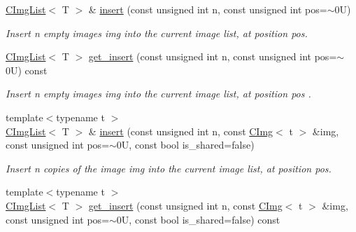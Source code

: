 \begin{Indent}
\begin{DoxyCompactItemize}
\hyperlink{structcimg__library__suffixed_1_1CImgList}{C\+Img\+List}$<$ T $>$ \& \hyperlink{structcimg__library__suffixed_1_1CImgList_a2e79008da95bb19c9f3541ce1ed592c8}{insert} (const unsigned int n, const unsigned int pos=$\sim$0\+U)
\begin{DoxyCompactList}\small\item\em Insert n empty images img into the current image list, at position {\ttfamily pos}. \end{DoxyCompactList}\item 
\mbox{\label{structcimg__library__suffixed_1_1CImgList_a847eb73d4dfcba9078b210cf80ce624b}} 
\hyperlink{structcimg__library__suffixed_1_1CImgList}{C\+Img\+List}$<$ T $>$ \hyperlink{structcimg__library__suffixed_1_1CImgList_a847eb73d4dfcba9078b210cf80ce624b}{get\+\_\+insert} (const unsigned int n, const unsigned int pos=$\sim$0\+U) const
\begin{DoxyCompactList}\small\item\em Insert n empty images img into the current image list, at position {\ttfamily pos} . \end{DoxyCompactList}\item 
{\footnotesize template$<$typename t $>$ }\\\hyperlink{structcimg__library__suffixed_1_1CImgList}{C\+Img\+List}$<$ T $>$ \& \hyperlink{structcimg__library__suffixed_1_1CImgList_a87ff890dcd5acf1eafb37fbf0c298b03}{insert} (const unsigned int n, const \hyperlink{structcimg__library__suffixed_1_1CImg}{C\+Img}$<$ t $>$ \&img, const unsigned int pos=$\sim$0\+U, const bool is\+\_\+shared=false)
\begin{DoxyCompactList}\small\item\em Insert {\ttfamily n} copies of the image {\ttfamily img} into the current image list, at position {\ttfamily pos}. \end{DoxyCompactList}\item 
\mbox{\label{structcimg__library__suffixed_1_1CImgList_a817d04c7b90f0cd39e33e740bf5f60f2}} 
{\footnotesize template$<$typename t $>$ }\\\hyperlink{structcimg__library__suffixed_1_1CImgList}{C\+Img\+List}$<$ T $>$ \hyperlink{structcimg__library__suffixed_1_1CImgList_a817d04c7b90f0cd39e33e740bf5f60f2}{get\+\_\+insert} (const unsigned int n, const \hyperlink{structcimg__library__suffixed_1_1CImg}{C\+Img}$<$ t $>$ \&img, const unsigned int pos=$\sim$0\+U, const bool is\+\_\+shared=false) const

\end{DoxyCompactItemize}
\end{Indent}

